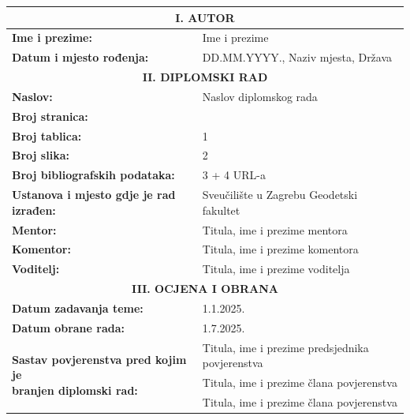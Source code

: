 \documentclass[12pt, oneside, a4paper, hidelinks]{report}
\newcommand{\mytitle}{Naslov diplomskog rada}
\newcommand{\myauthor}{Ime i prezime}
\begin{document}
	\newpage
	\restoregeometry
	\fancyhf{}
	\fancyfoot[R]{\small \thepage}
	\begin{table}[H]
		\centering
		\renewcommand{\arraystretch}{1.5}
		\begin{tabular}{|m{}|m{}|} 
			\hline
			\multicolumn{2}{|c|}{\textbf{I. AUTOR}} \\ \hline
			\textbf{Ime i prezime:} & \myauthor \\ \hline
			\textbf{Datum i mjesto rođenja:} & DD.MM.YYYY., Naziv mjesta, Država \\ \hline
			\multicolumn{2}{|c|}{\textbf{II. DIPLOMSKI RAD}} \\ \hline
			\textbf{Naslov:} & \mytitle \\ \hline
			\textbf{Broj stranica:} & \pageref{endOfWrittenWork} \\ \hline
			\textbf{Broj tablica:} & 1 \\ \hline
			\textbf{Broj slika:} & 2 \\ \hline
			\textbf{Broj bibliografskih podataka:} & 3 + 4 URL-a \\ \hline
			\textbf{Ustanova i mjesto gdje je rad izrađen:} & Sveučilište u Zagrebu Geodetski fakultet \\ \hline
			\textbf{Mentor:} & Titula, ime i prezime mentora \\ \hline
			\textbf{Komentor:} & Titula, ime i prezime komentora \\ \hline
			\textbf{Voditelj:} & Titula, ime i prezime voditelja \\ \hline
			
			\multicolumn{2}{|c|}{\textbf{III. OCJENA I OBRANA}} \\ \hline
			\textbf{Datum zadavanja teme:} & 1.1.2025. \\ \hline
			\textbf{Datum obrane rada:} & 1.7.2025. \\ \hline
			
			\multirow{3}{*}{\parbox{0.45\textwidth}{\textbf{Sastav povjerenstva pred kojim je\\ branjen diplomski rad:}}} 
			& Titula, ime i prezime predsjednika povjerenstva \\ \cline{2-2}
			& Titula, ime i prezime člana povjerenstva \\ \cline{2-2}
			& Titula, ime i prezime člana povjerenstva \\ \hline
		\end{tabular}
	\end{table}
	
\end{document}
